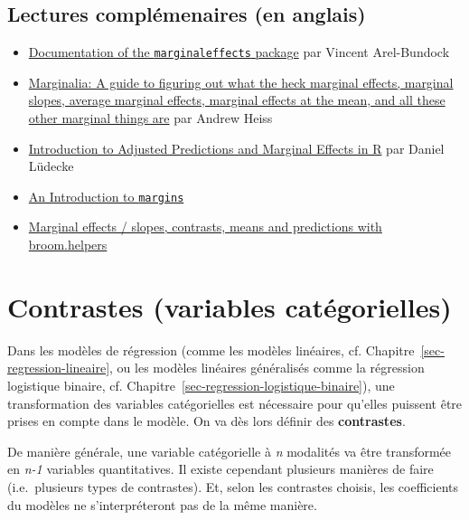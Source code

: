 \documentclass[
  letterpaper,
  DIV=11,
  numbers=noendperiod,
  oneside]{scrreprt}
\providecommand{\tightlist}{%
  \setlength{\itemsep}{0pt}\setlength{\parskip}{0pt}}\usepackage{longtable,booktabs,array}
\begin{document}
\hypertarget{lectures-compluxe9menaires-en-anglais}{%
\section{Lectures complémenaires (en
anglais)}\label{lectures-compluxe9menaires-en-anglais}}

\begin{itemize}
\tightlist
\item
  \href{https://vincentarelbundock.github.io/marginaleffects/}{Documentation
  of the \texttt{marginaleffects} package} par Vincent Arel-Bundock
\item
  \href{https://www.andrewheiss.com/blog/2022/05/20/marginalia/}{Marginalia:
  A guide to figuring out what the heck marginal effects, marginal
  slopes, average marginal effects, marginal effects at the mean, and
  all these other marginal things are} par Andrew Heiss
\item
  \href{https://strengejacke.github.io/ggeffects/articles/introduction_marginal_effects.html}{Introduction
  to Adjusted Predictions and Marginal Effects in R} par Daniel Lüdecke
\item
  \href{https://cran.r-project.org/web/packages/margins/vignettes/Introduction.html}{An
  Introduction to \texttt{margins}}
\item
  \href{https://larmarange.github.io/broom.helpers/articles/marginal_tidiers.html}{Marginal
  effects / slopes, contrasts, means and predictions with broom.helpers}
\end{itemize}

\hypertarget{sec-contrastes}{%
\chapter{Contrastes (variables catégorielles)}\label{sec-contrastes}}

Dans les modèles de régression (comme les modèles linéaires, cf.
Chapitre~\ref{sec-regression-lineaire}, ou les modèles linéaires
généralisés comme la régression logistique binaire, cf.
Chapitre~\ref{sec-regression-logistique-binaire}), une transformation
des variables catégorielles est nécessaire pour qu'elles puissent être
prises en compte dans le modèle. On va dès lors définir des
\textbf{contrastes}.

De manière générale, une variable catégorielle à \emph{n} modalités va
être transformée en \emph{n-1} variables quantitatives. Il existe
cependant plusieurs manières de faire (i.e.~plusieurs types de
contrastes). Et, selon les contrastes choisis, les coefficients du
modèles ne s'interpréteront pas de la même manière.
\end{document}
